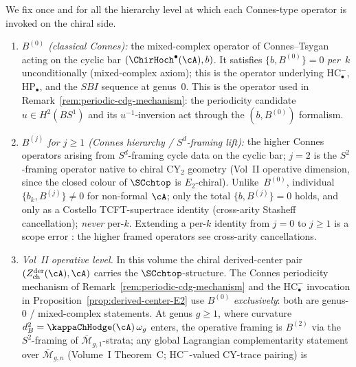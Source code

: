 \begin{remark}
\label{rem:B-j-hierarchy-convention-chiral}
%
%
We fix once and for all the hierarchy level at which
each Connes-type operator is invoked on the chiral side.
\begin{enumerate}[label=\textup{(\alph*)}]
\item \emph{$B^{(0)}$ \textup{(}classical Connes\textup{)}:} the
mixed-complex operator of
Connes--Tsygan~\textup{\cite{Con85,LQ84}} acting on the cyclic bar
$(\ChirHoch^\bullet(\cA), b)$. It satisfies
$\{b, B^{(0)}\} = 0$ \emph{per~$k$} unconditionally (mixed-complex
axiom); this is the operator underlying
$\mathrm{HC}^-_\bullet$, $\mathrm{HP}_\bullet$, and the
$SBI$ sequence at genus~$0$. This is the operator used in
Remark~\ref{rem:periodic-cdg-mechanism}: the periodicity candidate
$u \in H^2(BS^1)$ and its $u^{-1}$-inversion act through the
$(b, B^{(0)})$ formalism.
\item \emph{$B^{(j)}$ for $j\geq 1$ \textup{(}Connes hierarchy /
$S^d$-framing lift\textup{)}:} the higher Connes operators arising
from $S^d$-framing cycle data on the cyclic bar\textup{;}
$j=2$ is the $S^2$-framing operator native to chiral $\mathrm{CY}_2$
geometry \textup{(}Vol~II operative dimension, since the closed
colour of $\SCchtop$ is $E_2$-chiral\textup{)}. Unlike~$B^{(0)}$,
individual $\{b_k, B^{(j)}\}\neq 0$ for non-formal
$\cA$\textup{;} only the total
$\{b, B^{(j)}\} = 0$ holds, and only as a Costello
TCFT-supertrace identity \textup{(}cross-arity Stasheff
cancellation\textup{)}; \emph{never} per-$k$. Extending a
per-$k$ identity from $j=0$ to $j\geq 1$ is a scope error
\textup{:} the higher framed operators see cross-arity cancellations.
\item \emph{Vol~II operative level.} In this volume the chiral
derived-center pair $(Z^{\mathrm{der}}_{\mathrm{ch}}(\cA),\cA)$
carries the $\SCchtop$-structure. The Connes
periodicity mechanism of Remark~\ref{rem:periodic-cdg-mechanism}
and the $\mathrm{HC}^-_\bullet$ invocation in
Proposition~\ref{prop:derived-center-E2} use $B^{(0)}$
\emph{exclusively}: both are genus-$0$ / mixed-complex statements.
At genus $g\geq 1$, where curvature
$d_B^2 = \kappaChHodge(\cA)\,\omega_g$ enters, the operative framing is
$B^{(2)}$ via the $S^2$-framing of
$\overline{\mathcal{M}}_{g,1}$-strata; any global Lagrangian
complementarity statement over
$\overline{\mathcal{M}}_{g,n}$ \textup{(}Volume~I
Theorem~C; $\mathrm{HC}^-$-valued CY-trace pairing\textup{)} is

\end{enumerate}
\end{remark}
